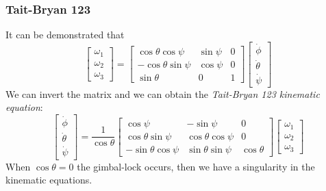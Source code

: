 \subsubsection{Tait-Bryan 123}
It can be demonstrated that
\begin{equation}
        \begin{bmatrix}
            \omega_1\\
            \omega_2\\
            \omega_3
        \end{bmatrix} = 
        \begin{bmatrix}
           \cos\theta\cos\psi&\sin\psi&0\\
           -\cos\theta\sin\psi&\cos\psi&0\\
           \sin\theta&0&1
        \end{bmatrix}
        \begin{bmatrix}
            \dot{\phi}\\
            \dot{\theta}\\
            \dot{\psi}
        \end{bmatrix}
\end{equation}
We can invert the matrix and we can obtain the \textit{Tait-Bryan 123 kinematic equation}:
\begin{equation}
    \begin{bmatrix}
        \dot{\phi}\\
        \dot{\theta}\\
        \dot{\psi}
    \end{bmatrix}=\frac{1}{\cos\theta}\begin{bmatrix}
        \cos\psi&-\sin\psi&0\\
        \cos\theta\sin\psi&\cos\theta\cos\psi&0\\
        -\sin\theta\cos\psi&\sin\theta\sin\psi&\cos\theta
    \end{bmatrix}\begin{bmatrix}
        \omega_1\\
        \omega_2\\
        \omega_3
    \end{bmatrix}
\end{equation}
When $\cos\theta=0$ the gimbal-lock occurs, then we have a singularity in the kinematic equations.



